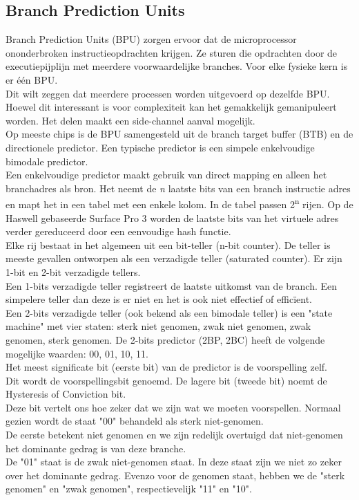 \subsection{Branch Prediction Units}
Branch Prediction Units (BPU) zorgen ervoor dat de microprocessor ononderbroken instructieopdrachten krijgen.
Ze sturen die opdrachten door de executiepijplijn met meerdere voorwaardelijke branches.
Voor elke fysieke kern is er één BPU.\\
Dit wilt zeggen dat meerdere processen worden uitgevoerd op dezelfde BPU.
Hoewel dit interessant is voor complexiteit kan het gemakkelijk gemanipuleert worden.
Het delen maakt een side-channel aanval mogelijk.\\
Op meeste chips is de BPU samengesteld uit de branch target buffer (BTB) en de directionele predictor.
Een typische predictor is een simpele enkelvoudige bimodale predictor.\\
Een enkelvoudige predictor maakt gebruik van direct mapping en alleen het branchadres als bron.
Het neemt de \emph{n} laatste bits van een branch instructie adres en mapt het in een tabel met een enkele kolom. In de tabel passen 2\textsuperscript{n} rijen.
Op de Haswell gebaseerde Surface Pro 3 worden de laatste bits van het virtuele adres
verder gereduceerd door een eenvoudige hash
functie.\\
Elke rij bestaat in het algemeen uit een bit-teller (n-bit counter).
De teller is meeste gevallen ontworpen als een verzadigde teller (saturated counter).
Er zijn 1-bit en 2-bit verzadigde tellers.\\
Een 1-bits verzadigde teller registreert de laatste uitkomst van de branch.
Een simpelere teller dan deze is er niet en het is ook niet effectief of efficïent.\\

Een 2-bits verzadigde teller (ook bekend als een bimodale teller) is een "state machine" met vier staten: sterk niet genomen, zwak niet genomen, zwak genomen, sterk genomen. \parencite{Lee2017}
De 2-bits predictor (2BP, 2BC) heeft de volgende mogelijke waarden: 00, 01, 10, 11.\\
Het meest significate bit (eerste bit) van de predictor is de voorspelling zelf.\\
Dit wordt de voorspellingsbit genoemd.
De lagere bit (tweede bit) noemt de Hysteresis of Conviction bit.\\
Deze bit vertelt ons hoe zeker dat we zijn wat we moeten voorspellen.
Normaal gezien wordt de staat "00" behandeld als sterk niet-genomen.\\
De eerste betekent niet genomen en we zijn redelijk overtuigd dat niet-genomen het dominante gedrag is van deze branche.\\
De "01" staat is de zwak niet-genomen staat. In deze staat zijn we niet zo zeker over het dominante gedrag.
Evenzo voor de genomen staat, hebben we de "sterk genomen" en "zwak genomen", respectievelijk "11" en "10".



